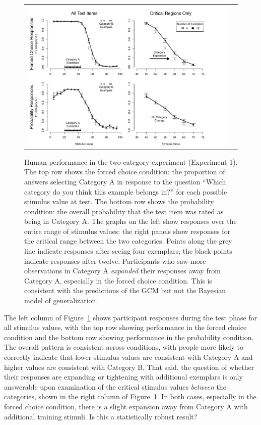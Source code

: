 \documentclass[doc,apacite]{apa6}
\begin{document}
\begin{figure}[t]
\begin{center}
\begin{tabular}{cc}
\includegraphics[width=5in]{figures/two_cat_results.pdf}
\end{tabular}
\end{center}
\caption{{\small Human performance in the two-category experiment (Experiment 1). The top row shows the {\sc forced choice} condition: the proportion of answers selecting Category A in response to the question ``Which category do you think this example belongs in?'' for each possible stimulus value at test. The bottom row shows the {\sc probability} condition: the overall probability that the test item was rated as being in Category A. The graphs on the left show responses over the entire range of stimulus values; the right panels show responses for the critical range between the two categories. Points along the grey line indicate responses after seeing {\sc four} exemplars; the black points indicate responses after {\sc twelve}. Participants who saw more observations in Category A {\it expanded} their responses away from Category A, especially in the {\sc forced choice} condition. This is consistent with the predictions of the GCM but not the Bayesian model of generalization.}}
\label{fig:exp1results}
\end{figure}

The left column of Figure~\ref{fig:exp1results} shows participant responses during the test phase for all stimulus values, with the top row showing performance in the {\sc forced choice} condition and the bottom row showing performance in the {\sc probability} condition. The overall pattern is consistent across conditions, with people more likely to correctly indicate that lower stimulus values are consistent with Category A and higher values are consistent with Category B. That said, the question of whether their responses are expanding or tightening with additional exemplars is only answerable upon examination of the critical stimulus values {\it between} the categories, shown in the right column of Figure~\ref{fig:exp1results}. In both cases, especially in the {\sc forced choice} condition, there is a slight expansion away from Category A with additional training stimuli. Is this a statistically robust result?
\end{document}
